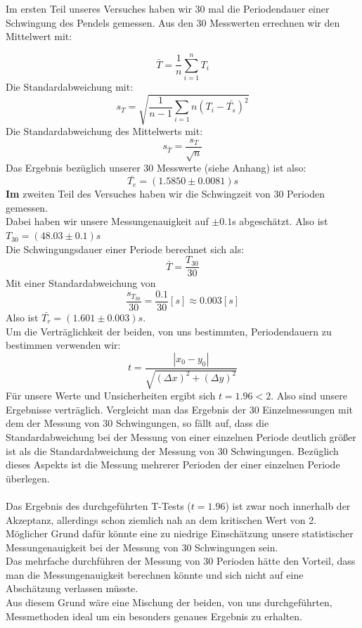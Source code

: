 \documentclass[11pt,a4paper]{article}
\begin{document}
	Im ersten Teil unseres Versuches haben wir 30 mal die Periodendauer einer Schwingung des Pendels
	gemessen. Aus den 30 Messwerten errechnen wir den Mittelwert mit:

	\begin{equation}
	\bar{T} = \frac{1}{n} \sum_{i=1}^{n} T_i
	\end{equation}
	Die Standardabweichung mit:
	\begin{equation}
	s_T=\sqrt{\frac{1}{n-1}\sum_{i=1}{n} (T_i - \bar{T_s})^2}
	\end{equation}
	Die Standardabweichung des Mittelwerts mit:
	\begin{equation}
	s_{\bar{T}}=\frac{s_T}{\sqrt{n}}
	\end{equation}
	Das Ergebnis bezüglich unserer 30 Messwerte (siehe Anhang) ist also:
	\begin{equation*}
	\bar{T_e}=(1.5850 \pm 0.0081)s
	\end{equation*}
	{\bf Im} zweiten Teil des Versuches haben wir die Schwingzeit von 30 Perioden gemessen. \\
	Dabei haben wir unsere Messungenauigkeit auf $\pm 0.1$s abgeschätzt. Also ist $T_{30}=(48.03\pm 0.1)s$
	\\
	Die Schwingungsdauer einer Periode berechnet sich als:
	\begin{equation*}
	\bar{T}=\frac{T_{30}}{30}
	\end{equation*}
	Mit einer Standardabweichung von $$\frac{s_{T_{30}}}{30}=\frac{0.1}{30}[s]\approx 0.003[s]$$
	Also ist $\bar{T_r}=(1.601\pm 0.003)s$. \\
	Um die Verträglichkeit der beiden, von uns bestimmten, Periodendauern zu bestimmen verwenden wir:
	\begin{equation}
	t=\frac{ |x_0 -y_0|}{\sqrt{(\Delta x)^2 + (\Delta y)^2}}
	\end{equation}
	Für unsere Werte und Unsicherheiten ergibt sich $t=1.96<2$. Also sind unsere Ergebnisse verträglich.
	Vergleicht man das Ergebnis der 30 Einzelmessungen mit dem der Messung von 30 Schwingungen,
	so fällt auf, dass die Standardabweichung bei der Messung von einer einzelnen Periode deutlich
	größer ist als die Standardabweichung der Messung von 30 Schwingungen.
	Bezüglich dieses Aspekts ist die Messung mehrerer Perioden der einer einzelnen Periode überlegen.
	\\
	\\
	Das Ergebnis des durchgeführten T-Tests ($t=1.96$) ist zwar noch innerhalb der Akzeptanz, allerdings schon
	ziemlich nah an dem kritischen Wert von 2.
	Möglicher Grund dafür könnte eine zu niedrige Einschätzung unsere statistischer Messungenauigkeit bei der Messung von 30 Schwingungen sein.
	\\Das mehrfache durchführen der Messung von 30 Perioden hätte den Vorteil, dass man die Messungenauigkeit berechnen könnte und sich nicht auf eine Abschätzung verlassen müsste.
	\\
	Aus diesem Grund wäre eine Mischung der beiden, von uns durchgeführten, Messmethoden ideal um ein
	besonders genaues Ergebnis zu erhalten.
\end{document}
